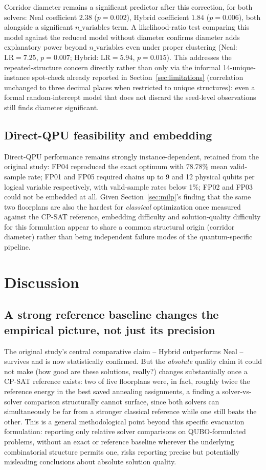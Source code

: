\documentclass[11pt]{article}
\begin{document}
Corridor diameter remains a significant predictor after this correction, for both solvers: Neal coefficient $2.38$ ($p=0.002$), Hybrid coefficient $1.84$ ($p=0.006$), both alongside a significant $n\_\text{variables}$ term. A likelihood-ratio test comparing this model against the reduced model without diameter confirms diameter adds explanatory power beyond $n\_\text{variables}$ even under proper clustering (Neal: $\text{LR}=7.25$, $p=0.007$; Hybrid: $\text{LR}=5.94$, $p=0.015$). This addresses the repeated-structure concern directly rather than only via the informal 14-unique-instance spot-check already reported in Section~\ref{sec:limitations} (correlation unchanged to three decimal places when restricted to unique structures): even a formal random-intercept model that does not discard the seed-level observations still finds diameter significant.

\subsection{Direct-QPU feasibility and embedding}
Direct-QPU performance remains strongly instance-dependent, retained from the original study: FP04 reproduced the exact optimum with 78.78\% mean valid-sample rate; FP01 and FP05 required chains up to 9 and 12 physical qubits per logical variable respectively, with valid-sample rates below 1\%; FP02 and FP03 could not be embedded at all. Given Section~\ref{sec:milp}'s finding that the same two floorplans are also the hardest for \emph{classical} optimization once measured against the CP-SAT reference, embedding difficulty and solution-quality difficulty for this formulation appear to share a common structural origin (corridor diameter) rather than being independent failure modes of the quantum-specific pipeline.

\section{Discussion}

\subsection{A strong reference baseline changes the empirical picture, not just its precision}
The original study's central comparative claim -- Hybrid outperforms Neal -- survives and is now statistically confirmed. But the \emph{absolute} quality claim it could not make (how good are these solutions, really?) changes substantially once a CP-SAT reference exists: two of five floorplans were, in fact, roughly twice the reference energy in the best saved annealing assignments, a finding a solver-vs-solver comparison structurally cannot surface, since both solvers can simultaneously be far from a stronger classical reference while one still beats the other. This is a general methodological point beyond this specific evacuation formulation: reporting only relative solver comparisons on QUBO-formulated problems, without an exact or reference baseline wherever the underlying combinatorial structure permits one, risks reporting precise but potentially misleading conclusions about absolute solution quality.
\end{document}
